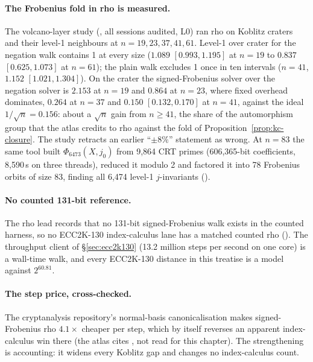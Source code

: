 \paragraph{The Frobenius fold in rho is measured.} The volcano-layer study
(, all sessions
audited, L0) ran rho on Koblitz craters and their level-1 neighbours at
$n=19,23,37,41,61$. Level-1 over crater for the negation walk contains 1
at every size ($1.089$ $[0.993,1.195]$ at $n=19$ to $0.837$ $[0.625,1.073]$
at $n=61$); the plain walk excludes 1 once in ten intervals ($n=41$,
$1.152$ $[1.021,1.304]$). On the crater the signed-Frobenius solver over
the negation solver is $2.153$ at $n=19$ and $0.864$ at $n=23$, where fixed
overhead dominates, $0.264$ at $n=37$ and $0.150$ $[0.132,0.170]$ at
$n=41$, against the ideal $1/\sqrt n=0.156$: about a $\sqrt n$ gain from
$n\ge41$, the share of the automorphism group that the atlas credits to rho
against the fold of Proposition~\ref{prop:kc-closure}. The study retracts an earlier ``$\pm8\%$''
statement as wrong. At $n=83$ the same tool built $\Phi_{6473}(X,j_0)$ from
9{,}864 CRT primes (606{,}365-bit coefficients, 8{,}590\,s on three
threads), reduced it modulo 2 and factored it into 78 Frobenius orbits of
size 83, finding all 6{,}474 level-1 $j$-invariants
().

\paragraph{No counted 131-bit reference.} The rho lead records that no
131-bit signed-Frobenius walk exists in the counted harness, so no
ECC2K-130 index-calculus lane has a matched counted rho
().
The throughput client of \S\ref{sec:ecc2k130} (13.2 million steps per
second on one core) is a wall-time walk, and every ECC2K-130 distance in
this treatise is a model against $2^{60.81}$.

\paragraph{The step price, cross-checked.} The cryptanalysis repository's
normal-basis canonicalisation makes signed-Frobenius rho $4.1\times$
cheaper per step, which by itself reverses an apparent index-calculus win
there (the atlas cites
, not read for
this chapter). The strengthening is accounting: it widens every Koblitz gap
and changes no index-calculus count.

